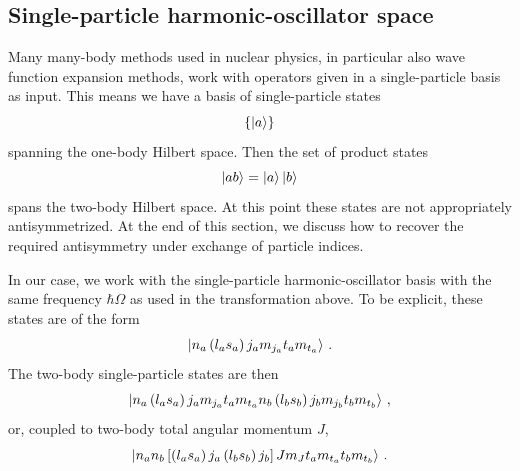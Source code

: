 \subsection{Single-particle harmonic-oscillator space}\label{sec:sp_ho}

Many many-body methods used in nuclear physics,
in particular also wave function expansion methods,
work with operators given in a single-particle basis as input.
This means we have a basis of single-particle states
\begin{equation}
  \left\{ \ket{a} \right\}
\end{equation}
spanning the one-body Hilbert space.
Then the set of product states
\begin{equation}
  \ket{a b} = \ket{a} \ket{b}
\end{equation}
spans the two-body Hilbert space.
At this point these states are not appropriately antisymmetrized.
At the end of this section,
we discuss how to recover the required antisymmetry under exchange of particle indices.

In our case, we work with the single-particle harmonic-oscillator basis with the same frequency $\hbar \Omega$
as used in the transformation above.
To be explicit, these states are of the form
\begin{equation}\label{eq:ho_sp_states}
  \ket{n_a \left(l_a s_a\right) j_a m_{j_{a}} t_a m_{t_a}}\,.
\end{equation}
The two-body single-particle states are then
\begin{equation}\label{eq:mscheme_twop_state}
  \ket{n_a \left(l_a s_a\right) j_a m_{j_{a}} t_a m_{t_a} n_b \left(l_b s_b\right) j_b m_{j_b} t_b m_{t_b}}\,,
\end{equation}
or, coupled to two-body total angular momentum $J$,
\begin{equation}\label{eq:jscheme_twop_state}
  \ket{n_a n_b \left[\left(l_a s_a\right) j_a \left(l_b s_b\right) j_b\right]J m_{J} t_a m_{t_a} t_b m_{t_b}}\,.
\end{equation}

